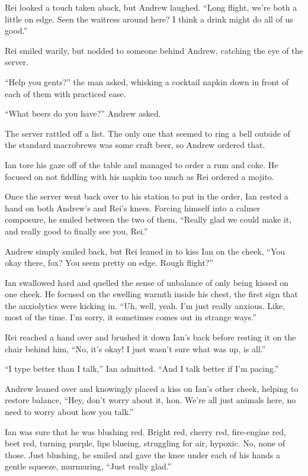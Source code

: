 Rei looked a touch taken aback, but Andrew laughed. ``Long flight, we're both a little on edge. Seen the waitress around here? I think a drink might do all of us good.''

Rei smiled warily, but nodded to someone behind Andrew, catching the eye of the server.

``Help you gents?'' the man asked, whisking a cocktail napkin down in front of each of them with practiced ease.

``What beers do you have?'' Andrew asked.

The server rattled off a list. The only one that seemed to ring a bell outside of the standard macrobrews was some craft beer, so Andrew ordered that.

Ian tore his gaze off of the table and managed to order a rum and coke. He focused on not fiddling with his napkin too much as Rei ordered a mojito.

Once the server went back over to his station to put in the order, Ian rested a hand on both Andrew's and Rei's knees. Forcing himself into a calmer composure, he smiled between the two of them, ``Really glad we could make it, and really good to finally see you, Rei.''

Andrew simply smiled back, but Rei leaned in to kiss Ian on the cheek, ``You okay there, fox? You seem pretty on edge. Rough flight?''

Ian swallowed hard and quelled the sense of unbalance of only being kissed on one cheek. He focused on the swelling warmth inside his chest, the first sign that the anxiolytics were kicking in. ``Uh, well, yeah. I'm just really anxious. Like, most of the time. I'm sorry, it sometimes comes out in strange ways.''

Rei reached a hand over and brushed it down Ian's back before resting it on the chair behind him, ``No, it's okay! I just wasn't sure what was up, is all.''

``I type better than I talk,'' Ian admitted. ``And I talk better if I'm pacing.''

Andrew leaned over and knowingly placed a kiss on Ian's other cheek, helping to restore balance, ``Hey, don't worry about it, hon. We're all just animals here, no need to worry about how you talk.''

Ian was sure that he was blushing red. Bright red, cherry red, fire-engine red, beet red, turning purple, lips blueing, struggling for air, hypoxic. No, none of those. Just blushing, he smiled and gave the knee under each of his hands a gentle squeeze, murmuring, ``Just really glad.''

